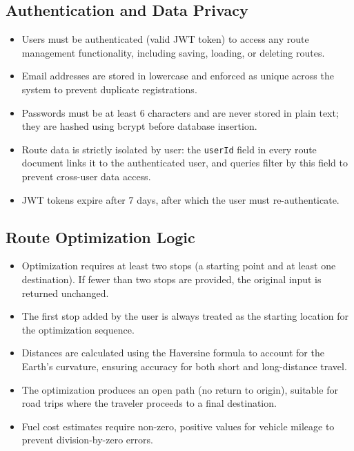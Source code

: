 \subsection{Authentication and Data Privacy}
\begin{itemize}
    \item Users must be authenticated (valid JWT token) to access any route management functionality, including saving, loading, or deleting routes.
    \item Email addresses are stored in lowercase and enforced as unique across the system to prevent duplicate registrations.
    \item Passwords must be at least 6 characters and are never stored in plain text; they are hashed using bcrypt before database insertion.
    \item Route data is strictly isolated by user: the \texttt{userId} field in every route document links it to the authenticated user, and queries filter by this field to prevent cross-user data access.
    \item JWT tokens expire after 7 days, after which the user must re-authenticate.
\end{itemize}

\subsection{Route Optimization Logic}
\begin{itemize}
    \item Optimization requires at least two stops (a starting point and at least one destination). If fewer than two stops are provided, the original input is returned unchanged.
    \item The first stop added by the user is always treated as the starting location for the optimization sequence.
    \item Distances are calculated using the Haversine formula to account for the Earth's curvature, ensuring accuracy for both short and long-distance travel.
    \item The optimization produces an open path (no return to origin), suitable for road trips where the traveler proceeds to a final destination.
    \item Fuel cost estimates require non-zero, positive values for vehicle mileage to prevent division-by-zero errors.
\end{itemize}

